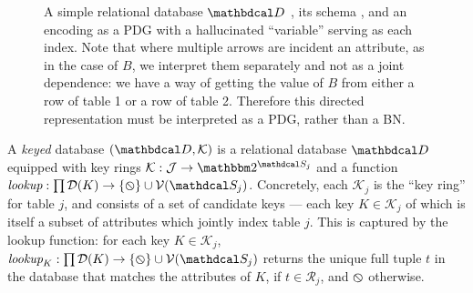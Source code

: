 \documentclass{article}
\begin{document}
\begin{figure}
{
	}
	\hfill\vline\hfill

	\caption{A simple relational database $\D$ , its schema , and an encoding as a PDG  with a hallucinated ``variable'' serving as each index. Note that where multiple arrows are incident an attribute, as in the case of $B$, we interpret them separately and not as a joint dependence: we have a way of getting the value of $B$ from either a row of table 1 or a row of table 2. Therefore this directed representation must be interpreted as a PDG, rather than a BN.} \label{fig:sketches}
\end{figure}

\begin{defn}
	A \emph{keyed} database $(\D, \mathcal K)$ is a relational database $\D$ %
	equipped with key rings $\mathcal K : \Idx \to \two^{\sch_j}$ and a function $\textit{lookup} : \prod\Doms(K) \to \{\none\} \cup \V(\sch_j)$. Concretely, each $\mathcal K_j$ is the ``key ring'' for table $j$, and consists of a set of candidate keys --- each key $K \in \mathcal K_j$ of which is itself a subset of attributes which jointly index table $j$. This is captured by the lookup function: for each key $K \in \mathcal K_j$, $\textit{lookup}_K : \prod\Doms(K) \to  \{\none\} \cup \V(\sch_j)$ returns the unique full tuple $t$ in the database that matches the attributes of $K$, if $t \in \mathcal R_j$, and $\varobslash$ otherwise.
\end{defn}
\end{document}
